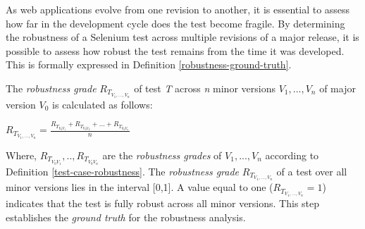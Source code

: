 
As web applications evolve from one revision to another, it is essential to assess how far in the development cycle does the test become fragile. By determining the robustness of a Selenium test across multiple revisions of a major release, it is possible to assess how robust the test remains from the time it was developed. This is formally expressed in Definition \ref{robustness-ground-truth}. 

\theoremstyle{definition}

\begin{definition}{The \textit{
robustness grade} ${R_{T_{V_1,...,V_n}}}$ of test \textit{T} across \textit{n} minor versions \textit{$V_1,...,V_n$} of major version \textit{$V_{0}$} is calculated as follows:}
\begin{center}
\vspace{0.5cm}
${R_{T_{V_1,...,V_n}}} = \displaystyle \frac{R_{T_{V_{0}V_{1}}} + R_{T_{V_{0}V_{2}}} + ... + R_{T_{V_{0}V_{n}}}}{n}$ \normalsize

\end{center}
\label{robustness-ground-truth}  
\end{definition} 


Where, \textit{$R_{T_{V_{0}V_{1}}},..,R_{T_{V_{0}V_{n}}}$} are the 
\textit{robustness grades} of \textit{$V_1,...,V_n$} according to Definition \ref{test-case-robustness}. The \textit{robustness grade} ${R_{T_{V_1,...,V_n}}}$ of a test over all minor versions lies in the interval [0,1]. A value equal to one (${R_{T_{V_1,...,V_n}}}=1$) indicates that the test is fully robust across all minor versions. This step establishes the \textit{ground truth} for the robustness analysis. 


